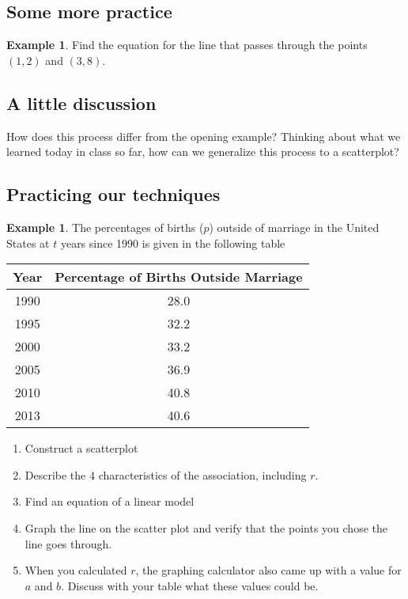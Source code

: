 \documentclass[11pt]{scrartcl}
\theoremstyle{definition}
\newtheorem{example}[theorem]{Example}
\begin{document}
\subsection*{Some more practice}
\begin{example}
	Find the equation for the line that passes through the points $(1,2)$ and $(3,8)$. 
\end{example}

\subsection*{A little discussion}
How does this process differ from the opening example? Thinking about what we learned today in class so far, how can we generalize this process to a scatterplot?

\subsection*{Practicing our techniques}
\begin{example}
	The percentages of births ($p$) outside of marriage in the United States at $t$ years since 1990 is given in the following table
	\begin{center}
	\begin{tabular}{c|c}
Year & Percentage of Births Outside Marriage \\ \hline
1990 & 28.0                                  \\
1995 & 32.2                                  \\
2000 & 33.2                                  \\
2005 & 36.9                                  \\
2010 & 40.8                                  \\
2013 & 40.6                                 
\end{tabular}
\end{center}

\begin{enumerate}
	\item Construct a scatterplot
	\item Describe the 4 characteristics of the association, including $r$.
	\item Find an equation of a linear model
	\item Graph the line on the scatter plot and verify that the points you chose the line goes through.
	\item When you calculated $r$, the graphing calculator also came up with a value for $a$ and $b$. Discuss with your table what these values could be.
\end{enumerate}

\end{example}
\end{document}
